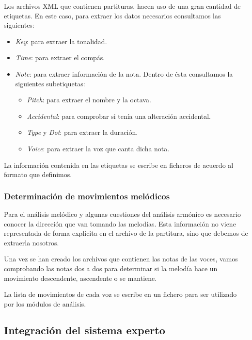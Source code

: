 Los archivos XML que contienen partituras, hacen uso de una gran cantidad de etiquetas. En este caso, para extraer los datos necesarios consultamos las siguientes:

\begin{itemize}

	\item \textit{Key}: para extraer la tonalidad.
	\item \textit{Time}: para extraer el compás.
	\item \textit{Note}: para extraer información de la nota. Dentro de ésta consultamos la siguientes subetiquetas:
		\begin{itemize}
			\item \textit{Pitch}: para extraer el nombre y la octava. 
			\item \textit{Accidental}: para comprobar si tenía una alteración accidental.
			\item \textit{Type} y \textit{Dot}: para extraer la duración.
			\item \textit{Voice}: para extraer la voz que canta dicha nota.
		\end{itemize}
\end{itemize}

La información contenida en las etiquetas se escribe en ficheros de acuerdo al formato que definimos.

\subsubsection{Determinación de movimientos melódicos}

Para el análisis melódico y algunas cuestiones del análisis armónico es necesario conocer la dirección que van tomando las melodías. Esta información no viene representada de forma explícita en el archivo de la partitura, sino que debemos de extraerla nosotros. 

Una vez se han creado los archivos que contienen las notas de las voces, vamos comprobando las notas dos a dos para determinar si la melodía hace un movimiento descendente, ascendente o se mantiene. 

La lista de movimientos de cada voz se escribe en un fichero para ser utilizado por los módulos de análisis.

\subsection{Integración del sistema experto}

